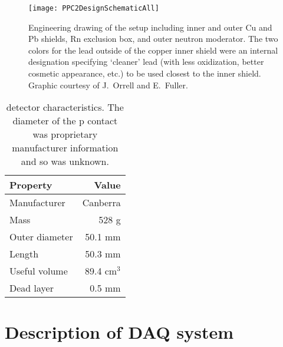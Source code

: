 			\begin{figure}
				\centering
				\texttt{[image: PPC2DesignSchematicAll]}
				\caption[Engineering drawing of  deployment, detailing outer components]
				{Engineering drawing of the setup including inner and outer Cu and Pb shields, Rn exclusion box, 
				and outer neutron moderator.  The two colors for the lead outside of the copper inner
				shield were an internal designation specifying `cleaner' lead (with less oxidization, better cosmetic appearance,
				 etc.) to be used closest to the inner shield.  Graphic courtesy of J.~Orrell and E.~Fuller.}
				\label{fig:PPC2Shield}
			\end{figure}
	
			\begin{table}
				\centering
				\begin{tabular}{l r}
					\toprule
					Property & Value \\
					\midrule
					Manufacturer & Canberra \\
					Mass & 528 g \\
					Outer diameter & 50.1 mm \\
					Length & 50.3 mm \\
					Useful volume & 89.4 cm$^{3}$\\
					Dead layer & 0.5 mm \\
					\bottomrule
				\end{tabular}
				\caption[ detector characteristics]
				{ detector characteristics.  The diameter of the p contact was proprietary manufacturer information and so
				was unknown. }
				\label{tab:PPC2Characteristics}
			\end{table}
	
	\section{Description of DAQ system}
	\label{sec:DeploymentPPC2SoudanDAQSystem}
	
